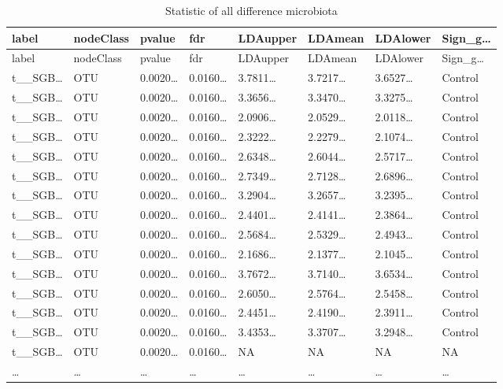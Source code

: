 \documentclass[
]{article}
\begin{document}
\begin{longtable}[]{@{}llllllll@{}}
\caption{\label{tab:Statistic-of-all-difference-microbiota}Statistic of all difference microbiota}\tabularnewline
\toprule
label & nodeClass & pvalue & fdr & LDAupper & LDAmean & LDAlower & Sign\_g\ldots{}\tabularnewline
\midrule
\endfirsthead
\toprule
label & nodeClass & pvalue & fdr & LDAupper & LDAmean & LDAlower & Sign\_g\ldots{}\tabularnewline
\midrule
\endhead
t\_\_SGB\ldots{} & OTU & 0.0020\ldots{} & 0.0160\ldots{} & 3.7811\ldots{} & 3.7217\ldots{} & 3.6527\ldots{} & Control\tabularnewline
t\_\_SGB\ldots{} & OTU & 0.0020\ldots{} & 0.0160\ldots{} & 3.3656\ldots{} & 3.3470\ldots{} & 3.3275\ldots{} & Control\tabularnewline
t\_\_SGB\ldots{} & OTU & 0.0020\ldots{} & 0.0160\ldots{} & 2.0906\ldots{} & 2.0529\ldots{} & 2.0118\ldots{} & Control\tabularnewline
t\_\_SGB\ldots{} & OTU & 0.0020\ldots{} & 0.0160\ldots{} & 2.3222\ldots{} & 2.2279\ldots{} & 2.1074\ldots{} & Control\tabularnewline
t\_\_SGB\ldots{} & OTU & 0.0020\ldots{} & 0.0160\ldots{} & 2.6348\ldots{} & 2.6044\ldots{} & 2.5717\ldots{} & Control\tabularnewline
t\_\_SGB\ldots{} & OTU & 0.0020\ldots{} & 0.0160\ldots{} & 2.7349\ldots{} & 2.7128\ldots{} & 2.6896\ldots{} & Control\tabularnewline
t\_\_SGB\ldots{} & OTU & 0.0020\ldots{} & 0.0160\ldots{} & 3.2904\ldots{} & 3.2657\ldots{} & 3.2395\ldots{} & Control\tabularnewline
t\_\_SGB\ldots{} & OTU & 0.0020\ldots{} & 0.0160\ldots{} & 2.4401\ldots{} & 2.4141\ldots{} & 2.3864\ldots{} & Control\tabularnewline
t\_\_SGB\ldots{} & OTU & 0.0020\ldots{} & 0.0160\ldots{} & 2.5684\ldots{} & 2.5329\ldots{} & 2.4943\ldots{} & Control\tabularnewline
t\_\_SGB\ldots{} & OTU & 0.0020\ldots{} & 0.0160\ldots{} & 2.1686\ldots{} & 2.1377\ldots{} & 2.1045\ldots{} & Control\tabularnewline
t\_\_SGB\ldots{} & OTU & 0.0020\ldots{} & 0.0160\ldots{} & 3.7672\ldots{} & 3.7140\ldots{} & 3.6534\ldots{} & Control\tabularnewline
t\_\_SGB\ldots{} & OTU & 0.0020\ldots{} & 0.0160\ldots{} & 2.6050\ldots{} & 2.5764\ldots{} & 2.5458\ldots{} & Control\tabularnewline
t\_\_SGB\ldots{} & OTU & 0.0020\ldots{} & 0.0160\ldots{} & 2.4451\ldots{} & 2.4190\ldots{} & 2.3911\ldots{} & Control\tabularnewline
t\_\_SGB\ldots{} & OTU & 0.0020\ldots{} & 0.0160\ldots{} & 3.4353\ldots{} & 3.3707\ldots{} & 3.2948\ldots{} & Control\tabularnewline
t\_\_SGB\ldots{} & OTU & 0.0020\ldots{} & 0.0160\ldots{} & NA & NA & NA & NA\tabularnewline
\ldots{} & \ldots{} & \ldots{} & \ldots{} & \ldots{} & \ldots{} & \ldots{} & \ldots{}\tabularnewline
\bottomrule
\end{longtable}
\end{document}

